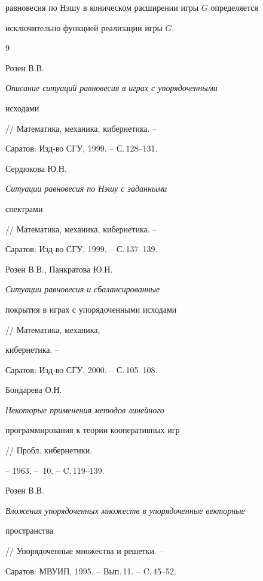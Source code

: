 равновесия по Нэшу в коническом расширении игры $G$ определяется 


исключительно функцией реализации игры $G$. 


 


\begin{thebibliography}{9} 


 




Розен В.В. {\em Описание ситуаций равновесия в играх с упорядоченными 


исходами} // Математика, механика, кибернетика. --


Саратов: Изд-во СГУ, 1999. -- С.\,128--131. 




Сердюкова Ю.Н. {\em Ситуации равновесия по Нэшу с заданными 


спектрами} // Математика, механика, кибернетика. --


Саратов: Изд-во СГУ, 1999. -- С.\,137--139. 




Розен В.В., Панкратова Ю.Н. {\em Ситуации равновесия и сбалансированные 


покрытия в играх с упорядоченными исходами} // Математика, механика, 


кибернетика. --


Саратов: Изд-во СГУ, 2000. -- С.\,105--108.




Бондарева О.Н. {\em Некоторые применения методов линейного 


программирования к теории кооперативных игр} // Пробл. кибернетики. 


-- 1963. -- \No\,10. -- C.\,119--139. 


 


\end{thebibliography} 


 


\vskip 2cm 


 






 


\label{end} 


 


 




Розен В.В. {\em Вложения упорядоченных множеств в упорядоченные векторные 


пространства} // Упорядоченные множества и решетки. --


Саратов: МВУИП, 1995. -- Вып.\,11. -- C.\,45--52. 


